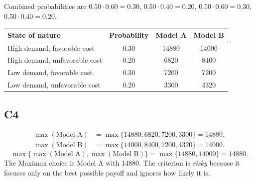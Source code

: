 \begin{ExamProblems}
\begin{center}
		\end{center}
		Combined probabilities are $0.50=0.30$, $0.50=0.20$, $0.50=0.30$, $0.50=0.20$.
		\begin{center}
			\begin{tabular}{l c c c}
				\toprule
				State of nature & Probability & Model A & Model B \\
				\midrule
				High demand, favorable cost & 0.30 & 14880 & 14000 \\
				High demand, unfavorable cost & 0.20 & 6820 & 8400 \\
				Low demand, favorable cost & 0.30 & 7200 & 7200 \\
				Low demand, unfavorable cost & 0.20 & 3300 & 4320 \\
				\bottomrule
			\end{tabular}
		\end{center}

		\subsection*{C4}
		\[
		\begin{aligned}
		\max(\text{Model A}) &= \max\{14880,6820,7200,3300\} = 14880,\\
		\max(\text{Model B}) &= \max\{14000,8400,7200,4320\} = 14000.
		\end{aligned}
		\]
		\[
		\max\{\max(\text{Model A}), \max(\text{Model B})\}
		= \max\{14880, 14000\}
		= 14880.
		\]
		The Maximax choice is Model A with 14880. The criterion is \emph{risky} because it focuses only on the best possible payoff and ignores how likely it is.


\end{ExamProblems}
